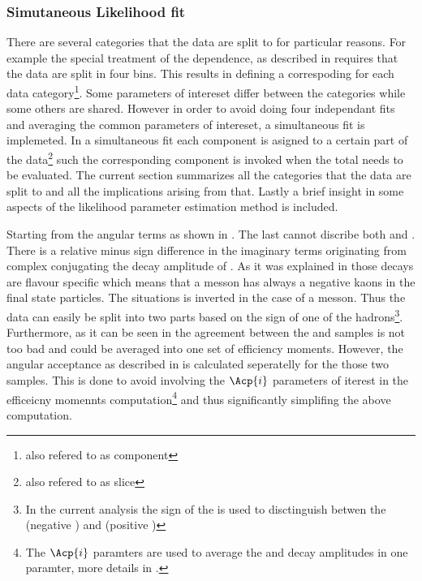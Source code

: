 \subsubsection{Simutaneous Likelihood fit}
\label{Simutaneous_Likelihood_fit}
There are several categories that the data are split to for particular reasons. 
For example the special treatment of the \mkpi dependence, as described in  requires that the data are
split in four \mkpi bins. This results in defining a correspoding \pdf for each data category\footnote{also refered to as component \pdf}.
Some parameters of intereset differ between the categories while some others are shared. 
However in order to avoid doing four independant fits and averaging the common parameters of intereset, 
a simultaneous fit is implemeted. In a simultaneous fit each component \pdf is asigned to a certain part of the data\footnote{also refered to as slice} 
such the corresponding component \pdf is invoked when the total \pdf needs to be evaluated. The current section summarizes
all the categories that the data are split to and all the implications arising from that. Lastly a brief insight in some aspects
of the likelihood parameter estimation method is included. 

Starting from the angular \pdf terms as shown in . The last cannot discribe both \BsJpsiKst and \BsbarJpsiKst. 
There is a relative minus sign difference in the imaginary terms originating from complex conjugating the decay amplitude of 
\BsJpsiKst. As it was explained in  those decays are flavour specific which means that a \Bs messon
has always a negative kaons in the final state particles. The situations is inverted in the case of a \Bsb messon.
Thus the data can easily be split into two parts based on the sign of one of the hadrons\footnote{In the current analysis the sign
of the \kaon is used to disctinguish betwen the \BsJpsiKst (negative \kaon) and \BsbarJpsiKst (positive \kaon) }.
Furthermore, as it can be seen in  the agreement between the \BsJpsiKst and \BsbarJpsiKst samples is not too 
bad and could be averaged into one set of efficiency moments. However, the angular acceptance as described in 
is calculated seperatelly for the those two samples. This is done to avoid involving the $\Acp{i}$ parameters of iterest
in the efficeicny momennts computation\footnote{The $\Acp{i}$ paramters are used to average the \BsJpsiKst and \BsbarJpsiKst decay amplitudes in one paramter,
more details in .} and thus significantly simplifing the above computation.

